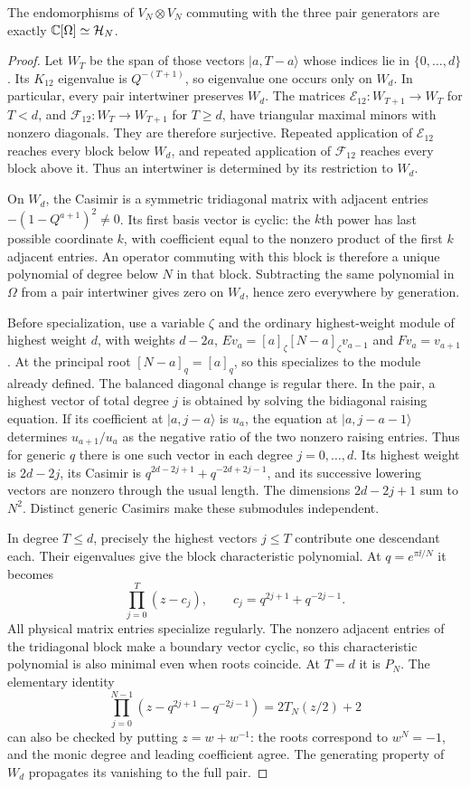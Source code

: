 \begin{lemma}\label{lem:commutant}
The endomorphisms of $V_N\otimes V_N$ commuting with the three pair generators are exactly $\mathbb C[\Omega]\simeq\mathcal H_N$.
\end{lemma}
\begin{proof}
Let $W_T$ be the span of those vectors $|a,T-a\rangle$ whose
indices lie in $\{0,\ldots,d\}$. Its $K_{12}$ eigenvalue is
$Q^{-(T+1)}$, so eigenvalue one occurs only on $W_d$. In particular,
every pair intertwiner preserves $W_d$. The matrices
$\mathcal E_{12}:W_{T+1}\to W_T$ for $T<d$, and
$\mathcal F_{12}:W_T\to W_{T+1}$ for $T\ge d$, have triangular
maximal minors with nonzero diagonals. They are therefore surjective.
Repeated application of $\mathcal E_{12}$ reaches every block below
$W_d$, and repeated application of $\mathcal F_{12}$ reaches every
block above it. Thus an intertwiner is determined by its restriction
to $W_d$.

On $W_d$, the Casimir is a symmetric tridiagonal matrix with adjacent entries $-(1-Q^{a+1})^2\ne0$. Its first basis vector is cyclic: the $k$th power has last possible coordinate $k$, with coefficient equal to the nonzero product of the first $k$ adjacent entries. An operator commuting with this block is therefore a unique polynomial of degree below $N$ in that block. Subtracting the same polynomial in $\Omega$ from a pair intertwiner gives zero on $W_d$, hence zero everywhere by generation.

Before specialization, use a variable $\zeta$ and the ordinary
highest-weight module of highest weight $d$, with weights $d-2a$,
$E v_a=[a]_\zeta[N-a]_\zeta v_{a-1}$ and $Fv_a=v_{a+1}$.
At the principal root $[N-a]_q=[a]_q$, so this specializes to the
module already defined. The balanced diagonal change is regular there. In the pair, a highest vector of total degree $j$ is obtained by solving the bidiagonal raising equation. If its coefficient at $|a,j-a\rangle$ is $u_a$, the equation at $|a,j-a-1\rangle$ determines $u_{a+1}/u_a$ as the negative ratio of the two nonzero raising entries. Thus for generic $q$ there is one such vector in each degree $j=0,\ldots,d$. Its highest weight is $2d-2j$, its Casimir is $q^{2d-2j+1}+q^{-2d+2j-1}$, and its successive lowering vectors are nonzero through the usual length. The dimensions $2d-2j+1$ sum to $N^2$. Distinct generic Casimirs make these submodules independent.

In degree $T\le d$, precisely the highest vectors $j\le T$ contribute one descendant each. Their eigenvalues give the block characteristic polynomial. At $q=e^{\pi\ii/N}$ it becomes
\[
 \prod_{j=0}^{T}(z-c_j),\qquad c_j=q^{2j+1}+q^{-2j-1}.
\]
All physical matrix entries specialize regularly. The nonzero adjacent entries of the tridiagonal block make a boundary vector cyclic, so this characteristic polynomial is also minimal even when roots coincide. At $T=d$ it is $P_N$. The elementary identity
\[
 \prod_{j=0}^{N-1}(z-q^{2j+1}-q^{-2j-1})=2T_N(z/2)+2
\]
can also be checked by putting $z=w+w^{-1}$: the roots correspond to $w^N=-1$, and the monic degree and leading coefficient agree. The generating property of $W_d$ propagates its vanishing to the full pair.



\end{proof}
